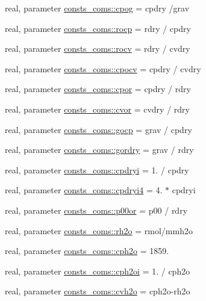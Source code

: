 \begin{DoxyCompactItemize}
\item 
real, parameter \hyperlink{namespaceconsts__coms_ad0da87258bfa78139a0358ed21b77d34}{consts\+\_\+coms\+::cpog} = cpdry /grav
\item 
real, parameter \hyperlink{namespaceconsts__coms_a6d1614e0bc215795946d72dd2dab1a16}{consts\+\_\+coms\+::rocp} = rdry / cpdry
\item 
real, parameter \hyperlink{namespaceconsts__coms_ac7edb2bbabc26e076bd858ad71bcb824}{consts\+\_\+coms\+::rocv} = rdry / cvdry
\item 
real, parameter \hyperlink{namespaceconsts__coms_a10b826bdb7e44b4a026e2a0cd1b1d8eb}{consts\+\_\+coms\+::cpocv} = cpdry / cvdry
\item 
real, parameter \hyperlink{namespaceconsts__coms_aa70dadabd4c23c98f57b0d05afaf13b9}{consts\+\_\+coms\+::cpor} = cpdry / rdry
\item 
real, parameter \hyperlink{namespaceconsts__coms_a0460927d177fee178c656807e4611487}{consts\+\_\+coms\+::cvor} = cvdry / rdry
\item 
real, parameter \hyperlink{namespaceconsts__coms_ab3b9cff7d1f517cc66c515e4d796d481}{consts\+\_\+coms\+::gocp} = grav / cpdry
\item 
real, parameter \hyperlink{namespaceconsts__coms_aedafedbfca68fe674d2905ccca6b25b7}{consts\+\_\+coms\+::gordry} = grav / rdry
\item 
real, parameter \hyperlink{namespaceconsts__coms_a10e4ab661d502a2925676615fcff8f53}{consts\+\_\+coms\+::cpdryi} = 1. / cpdry
\item 
real, parameter \hyperlink{namespaceconsts__coms_ab8bcfd7d3be31463cbbd8d4977ea747c}{consts\+\_\+coms\+::cpdryi4} = 4. $\ast$ cpdryi
\item 
real, parameter \hyperlink{namespaceconsts__coms_abd921b7231e57a62b37827f99d586965}{consts\+\_\+coms\+::p00or} = p00 / rdry
\item 
real, parameter \hyperlink{namespaceconsts__coms_ac3c72bd757c228e71a76062364a19c06}{consts\+\_\+coms\+::rh2o} = rmol/mmh2o
\item 
real, parameter \hyperlink{namespaceconsts__coms_ab6845975c5a7d568270b99fac73cecee}{consts\+\_\+coms\+::cph2o} = 1859.
\item 
real, parameter \hyperlink{namespaceconsts__coms_a060b8a4312550437cd56f415d22df8a1}{consts\+\_\+coms\+::cph2oi} = 1. / cph2o
\item 
real, parameter \hyperlink{namespaceconsts__coms_ab682f9c81b6c22b86609a07c45d0d169}{consts\+\_\+coms\+::cvh2o} = cph2o-\/rh2o
\item 

\end{DoxyCompactItemize}
